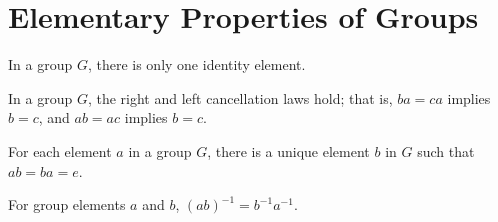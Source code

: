 \section{Elementary Properties of Groups}

\begin{theorem}
	In a group $G$, there is only one identity element.
\end{theorem}

\begin{theorem}[Cancellation]
	In a group $G$, the right and left cancellation laws hold; that is, $ba = ca$ implies $b = c$, and $ab = ac$ implies $b = c$.
\end{theorem}

\begin{theorem}
	For each element $a$ in a group $G$, there is a unique element $b$ in $G$ such that $ab = ba = e$.
\end{theorem}

\begin{theorem}
	For group elements $a$ and $b$, $(ab)^{-1} = b^{-1}a^{-1}$.
\end{theorem}
